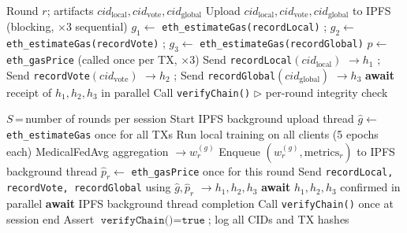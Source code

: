 \documentclass{llncs}
\begin{document}
\begin{algorithm}[h]
\caption{Baseline per-round fire-and-wait blockchain write}
\label{alg:faw}
\begin{algorithmic}[1]
\Require Round $r$; artifacts $\mathit{cid}_{\mathrm{local}}, \mathit{cid}_{\mathrm{vote}}, \mathit{cid}_{\mathrm{global}}$
\State Upload $\mathit{cid}_{\mathrm{local}}, \mathit{cid}_{\mathrm{vote}}, \mathit{cid}_{\mathrm{global}}$ to IPFS (blocking, $\times$3 sequential)
\State $g_1 \leftarrow$ \texttt{eth\_estimateGas(recordLocal)} \quad; $g_2 \leftarrow$ \texttt{eth\_estimateGas(recordVote)} \quad; $g_3 \leftarrow$ \texttt{eth\_estimateGas(recordGlobal)}
\State $p \leftarrow$ \texttt{eth\_gasPrice} (called once per TX, $\times$3)
\State Send \texttt{recordLocal}$(\mathit{cid}_{\mathrm{local}})$ $\rightarrow h_1$ \quad;
       Send \texttt{recordVote}$(\mathit{cid}_{\mathrm{vote}})$ $\rightarrow h_2$ \quad;
       Send \texttt{recordGlobal}$(\mathit{cid}_{\mathrm{global}})$ $\rightarrow h_3$
\State \textbf{await} receipt of $h_1, h_2, h_3$ in parallel
\State Call \texttt{verifyChain()} \quad $\triangleright$ per-round integrity check
\end{algorithmic}
\end{algorithm}

\begin{algorithm}[h]
\caption{Optimized FL-Blockchain session protocol (FLBL2-OPT)}
\label{alg:opt}
\begin{algorithmic}[1]
\Require $S$\,=\,number of rounds per session
\State Start IPFS background upload thread
\State $\hat{g} \leftarrow$ \texttt{eth\_estimateGas} once for all TXs  
  \State Run local training on all clients (5 epochs each)
  \State MedicalFedAvg aggregation $\rightarrow w_r^{(g)}$
  \State Enqueue $(w_r^{(g)},\text{metrics}_r)$ to IPFS background thread  
  \State $\hat{p}_r \leftarrow$ \texttt{eth\_gasPrice} once for this round  
  \State Send \texttt{recordLocal, recordVote, recordGlobal} using $\hat{g}, \hat{p}_r$ $\rightarrow h_1,h_2,h_3$
  \State \textbf{await} $h_1, h_2, h_3$ confirmed in parallel
\EndFor
\State \textbf{await} IPFS background thread completion  
\State Call \texttt{verifyChain()} once at session end  
\State Assert $\texttt{verifyChain()} = \texttt{true}$; log all CIDs and TX hashes
\end{algorithmic}
\end{algorithm}
\end{document}
